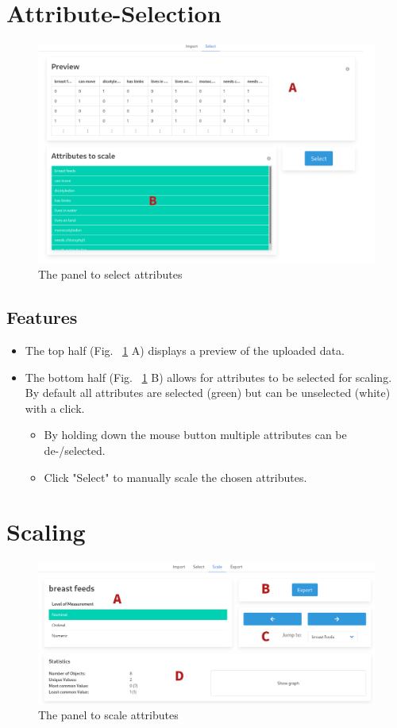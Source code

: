 \documentclass[]{article}
\begin{document}
\section{Attribute-Selection}
\begin{figure}[H]
	\includegraphics[width=\linewidth]{images/selection.png}
	\caption{The panel to select attributes}
	\label{fig:p2}
\end{figure}
\subsection{Features}
\begin{itemize}
    \item The top half (Fig. ~\ref{fig:p2} A) displays a preview of the uploaded data.
    \item The bottom half (Fig. ~\ref{fig:p2} B) allows for attributes to be selected for scaling. By default all attributes are selected (green) but can be unselected (white) with a click.
	\begin{itemize}
		\item By holding down the mouse button  multiple attributes can be de-/selected.
		\item Click "Select" to manually scale the chosen attributes.
	\end{itemize}
\end{itemize}

\section{Scaling}
\begin{figure}[H]
	\includegraphics[width=\linewidth]{images/nominal.png}
	\caption{The panel to scale attributes}
	\label{fig:p3}
\end{figure}
\end{document}
